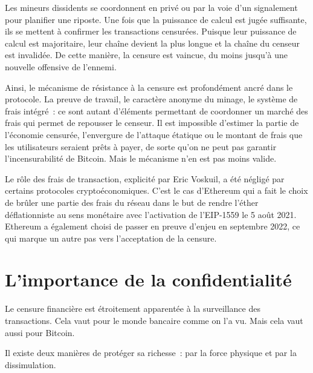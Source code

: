 Les mineurs dissidents se coordonnent en privé ou par la voie d'un signalement pour planifier une riposte. Une fois que la puissance de calcul est jugée suffisante, ils se mettent à confirmer les transactions censurées. Puisque leur puissance de calcul est majoritaire, leur chaîne devient la plus longue et la chaîne du censeur est invalidée. De cette manière, la censure est vaincue, du moins jusqu'à une nouvelle offensive de l'ennemi.

Ainsi, le mécanisme de résistance à la censure est profondément ancré dans le protocole. La preuve de travail, le caractère anonyme du minage, le système de frais intégré~: ce sont autant d'éléments permettant de coordonner un marché des frais qui permet de repousser le censeur. Il est impossible d'estimer la partie de l'économie censurée, l'envergure de l'attaque étatique ou le montant de frais que les utilisateurs seraient prêts à payer, de sorte qu'on ne peut pas garantir l'incensurabilité de Bitcoin. Mais le mécanisme n'en est pas moins valide.

Le rôle des frais de transaction, explicité par Eric Voskuil, a été négligé par certains protocoles cryptoéconomiques. C'est le cas d'Ethereum qui a fait le choix de brûler une partie des frais du réseau dans le but de rendre l'éther déflationniste au sens monétaire avec l'activation de l'EIP-1559 le 5 août 2021. Ethereum a également choisi de passer en preuve d'enjeu en septembre 2022, ce qui marque un autre pas vers l'acceptation de la censure.

\section*{L'importance de la confidentialité}

Le censure financière est étroitement apparentée à la surveillance des transactions. Cela vaut pour le monde bancaire comme on l'a vu. Mais cela vaut aussi pour Bitcoin.


Il existe deux manières de protéger sa richesse~: par la force physique et par la dissimulation.

